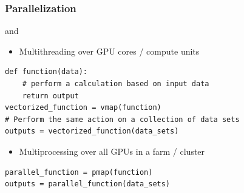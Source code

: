 \begin{frame}[fragile]
    \frametitle{Parallelization}

    \begin{figure}
       \begin{center}
       \end{center}
    \end{figure}
    
\end{frame}



\begin{frame}[fragile]

     and 

    \vspace{0.5em}
    \begin{itemize}
        \item Multithreading over GPU cores / compute units 
    \end{itemize}
    
    \begin{verbatim}
def function(data):
    # perform a calculation based on input data
    return output
vectorized_function = vmap(function)  
# Perform the same action on a collection of data sets
outputs = vectorized_function(data_sets)   
    \end{verbatim}

    \vspace{0.5em}
    \vspace{0.5em}
    \begin{itemize}
        \item Multiprocessing over all GPUs in a farm / cluster 
    \end{itemize}

    \begin{verbatim}
parallel_function = pmap(function)  
outputs = parallel_function(data_sets)  
    \end{verbatim}

\end{frame}



